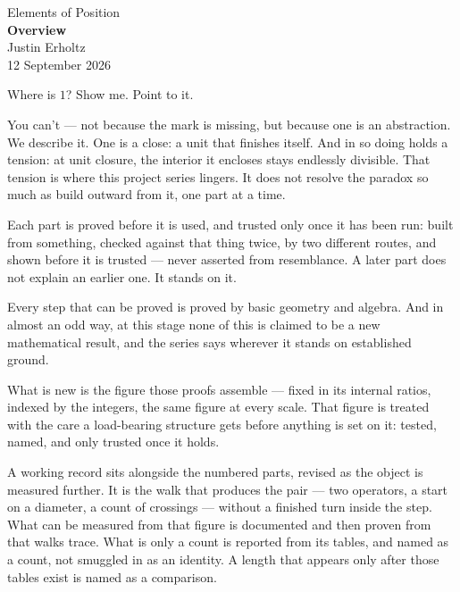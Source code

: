 \documentclass[10pt,a4paper]{article}
\begin{document}
\begin{center}
\vspace*{2.0em}
{\large Elements of Position}\\[1.5em]
{\LARGE\bfseries Overview}\\[2.0em]
{\normalsize Justin Erholtz}\\[0.3em]
{\small 12 September 2026}
\end{center}

\vspace{1.8em}

\noindent
Where is \(1\)? Show me. Point to it.

\vspace{0.6em}

\noindent
You can't --- not because the mark is missing, but because one is an abstraction. We describe it.
One is a close: a unit that finishes itself. And in so doing holds a tension: at unit closure, the interior it encloses stays endlessly divisible.
That tension is where this project series lingers. 
It does not resolve the paradox so much as build outward from it, one part at a time.

Each part is proved before it is used, and trusted only once it has been run: built from something, checked against that thing twice, by two different routes, and shown before it is trusted --- never asserted from resemblance.
A later part does not explain an earlier one.
It stands on it.

Every step that can be proved is proved by basic geometry and algebra.
And in almost an odd way, at this stage none of this is claimed to be a new mathematical result, and the series says wherever it stands on established ground.

What is new is the figure those proofs assemble --- fixed in its internal ratios, indexed by the integers, the same figure at every scale.
That figure is treated with the care a load-bearing structure gets before anything is set on it: tested, named, and only trusted once it holds.

A working record sits alongside the numbered parts, revised as the object is measured further.
It is the walk that produces the pair --- two operators, a start on a diameter, a count of crossings --- without a finished turn inside the step.
What can be measured from that figure is documented and then proven from that walks trace.
What is only a count is reported from its tables, and named as a count, not smuggled in as an identity.
A length that appears only after those tables exist is named as a comparison.
\end{document}
